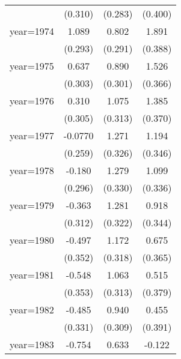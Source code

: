 {\begin{tabular}{l*{3}{c}}
                    &     (0.310)         &     (0.283)         &     (0.400)         \\
[1em]
year=1974           &       1.089\sym{***}&       0.802\sym{**} &       1.891\sym{***}\\
                    &     (0.293)         &     (0.291)         &     (0.388)         \\
[1em]
year=1975           &       0.637\sym{*}  &       0.890\sym{**} &       1.526\sym{***}\\
                    &     (0.303)         &     (0.301)         &     (0.366)         \\
[1em]
year=1976           &       0.310         &       1.075\sym{***}&       1.385\sym{***}\\
                    &     (0.305)         &     (0.313)         &     (0.370)         \\
[1em]
year=1977           &     -0.0770         &       1.271\sym{***}&       1.194\sym{***}\\
                    &     (0.259)         &     (0.326)         &     (0.346)         \\
[1em]
year=1978           &      -0.180         &       1.279\sym{***}&       1.099\sym{**} \\
                    &     (0.296)         &     (0.330)         &     (0.336)         \\
[1em]
year=1979           &      -0.363         &       1.281\sym{***}&       0.918\sym{**} \\
                    &     (0.312)         &     (0.322)         &     (0.344)         \\
[1em]
year=1980           &      -0.497         &       1.172\sym{***}&       0.675         \\
                    &     (0.352)         &     (0.318)         &     (0.365)         \\
[1em]
year=1981           &      -0.548         &       1.063\sym{**} &       0.515         \\
                    &     (0.353)         &     (0.313)         &     (0.379)         \\
[1em]
year=1982           &      -0.485         &       0.940\sym{**} &       0.455         \\
                    &     (0.331)         &     (0.309)         &     (0.391)         \\
[1em]
year=1983           &      -0.754\sym{*}  &       0.633\sym{*}  &      -0.122         \\

\end{tabular}}
